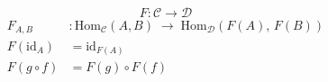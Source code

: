 \documentclass[aspectratio=169]{beamer}
\begin{document}
\begin{wallpaperframe}
\[
F : \mathcal{C} \to \mathcal{D}
\]
\begin{align*}
  F_{A,B} &: \mathrm{Hom}_{\mathcal{C}}(A, B) \;\longrightarrow\; \mathrm{Hom}_{\mathcal{D}}(F(A),\, F(B)) \\[6pt]
  F(\mathrm{id}_A) &= \mathrm{id}_{F(A)} \\
  F(g \circ f)     &= F(g) \circ F(f)
\end{align*}
\end{wallpaperframe}
\end{document}
